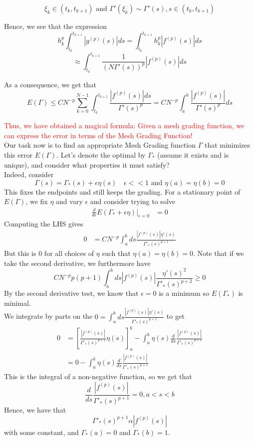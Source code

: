\documentclass{article}
\begin{document}
\[\xi_k \in (t_k,t_{k+1}) \text{ and } \Gamma'(\xi_k) \sim \Gamma'(s), s \in (t_k, t_{k+1})\]

Hence, we see that the expression
\[h_k^p \int_{t_k}^{t_{k+1}} |g^{(p)}(s)| ds = \int_{t_k}^{t_{k+1}} h_k^p |f^{(p)}(s)| ds \]
\[\approx \int_{t_k}^{t_{k+1}} \frac{1}{(N \Gamma'(s))^p} |f^{(p)}(s)| ds\]

As a consequence, we get that
\[E(\Gamma) \leq C N^{-p} \sum_{k = 0}^{N-1} \int_{t_k}^{t_{k+1}} \frac{|f^{(p)}(s)| ds}{\Gamma'(s)^p} = C N^{-p} \int_a^b \frac{|f^{(p)}(s)|}{\Gamma'(s)^p} ds  \]

\textcolor{red}{Thus, we have obtained a magical formula: Given a mesh grading function, we can express the error in terms of the Mesh Grading Function!}\\

Our task now is to find an appropriate Mesh Grading function $\Gamma$ that minimizes this error $E(\Gamma)$. Let's denote the optimal by $\Gamma_*$ (assume it exists and is unique), and consider what properties it must satisfy?\\

Indeed, consider
\[\Gamma(s) = \Gamma_*(s) + \epsilon \eta(s) \quad \epsilon << 1 \text{ and } \eta(a) = \eta(b) = 0\]
This fixes the endpoints and still keeps the grading. For a stationary point of $E(\Gamma)$, we fix $\eta$ and vary $\epsilon$ and consider trying to solve
\begin{align*}
    \frac{d}{d\epsilon} E(\Gamma_* + \epsilon \eta) |_{\epsilon = 0} &= 0
\end{align*}
Computing the LHS gives
\begin{align*}
    0 &= C N^{-p} \int_a^b ds \frac{|f^{(p)}(s)| \eta'(s)}{\Gamma'_*(s)^{p+1}} \tag*{Quotient Rule with respect to $\epsilon$}
\end{align*}
But this is $0$ for all choices of $\eta$ such that $\eta(a) = \eta(b) = 0$. Note that if we take the second derivative, we furthermore have
\[C N^{-p} p (p +1) \int_a^b ds |f^{(p)}(s)| \frac{\eta'(s)^2}{\Gamma'_*(s)^{p+2}} \geq 0\]
By the second derivative test, we know that $\epsilon = 0$ is a minimum so $E(\Gamma_*)$ is minimal.\\

We integrate by parts on the $0 = \int_a^b ds \frac{|f^{(p)}(s)| \eta'(s)}{\Gamma'_*(s)^{p+1}}$ to get 
\begin{align*}
    0 &= [\frac{|f^{(p)}(s)|}{\Gamma'_*(s)^{p+1}} \eta(s)]_a^b - \int_a^b \eta(s) \frac{d}{ds} \frac{|f^{(p)}(s)|}{\Gamma'_*(s)^{p+1}}\\
    &= 0 - \int_a^b \eta(s) \frac{d}{ds} \frac{|f^{(p)}(s)|}{\Gamma'_*(s)^{p+1}} \tag*{Since $\eta(a) = \eta(b) = 0$}
\end{align*}
This is the integral of a non-negative function, so we get that
\[\frac{d}{ds} \frac{|f^{(p)}(s)|}{\Gamma'_*(s)^{p+1}} = 0, a < s < b\]
Hence, we have that
\[\Gamma'_*(s)^{p+1} \alpha |f^{(p)}(s)|\]
with some constant, and $\Gamma_*(a) = 0$ and $\Gamma_*(b) = 1$.\\
\end{document}
